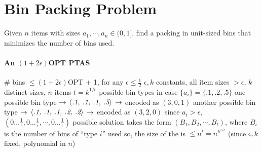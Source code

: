 \documentclass{note}
\begin{document}
\section*{Bin Packing Problem}
\begin{problem}
Given $n$ items with sizes $a_1, \cdots, a_n \in (0, 1]$,
find a packing in unit-sized bins that minimizes the number of bins
used.
\end{problem}

\paragraph{An $(1+2\epsilon)$OPT PTAS}
\bit
\w \# bins $\le (1+2\epsilon)$OPT + 1, for any $\epsilon \le \frac{1}{2}$
\w {} 
  $\epsilon, k$ constants, all item sizes $> \epsilon$, $k$ distinct sizes,
  $n$ items
\w $t = k^{1/\epsilon}$ possible bin types 
  \bit
  \w in case $\{a_i\} = \{.1, .2, .5\}$
  \w one possible bin type $\mbox{$\rightarrow$}$ $\mbox{$\langle{\textit{.1, .1, .1, .5}}\rangle$}$ $\mbox{$\rightarrow$}$ encoded as $(3, 0, 1)$
  \w another possible bin type $\mbox{$\rightarrow$}$ $\mbox{$\langle{\textit{.1, .1, .1, .2, .2}}\rangle$}$ 
     $\mbox{$\rightarrow$}$ encoded as $(3, 2, 0)$
  \w since $a_i > \epsilon$, $(0\ldots \frac{1}{\epsilon}, 
  0\ldots \frac{1}{\epsilon}, 
  \cdots, 0\ldots \frac{1}{\epsilon})$
  \eit
\w possible solution takes the form $(B_1, B_2, \cdots, B_t)$, 
   where $B_i$ is the number of bins of ``type $i$'' used
\w so, the size of the  is
  $\le n^t = n^{k^{1/\epsilon}}$
  (since $\epsilon, k$ fixed, polynomial in $n$)
\eit
\end{document}
